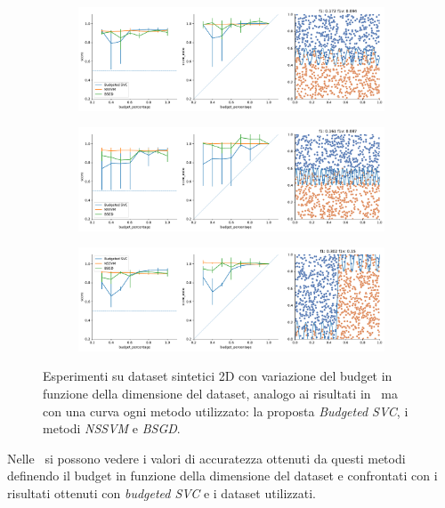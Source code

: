 \begin{figure}
\begin{subfigure}{.5\textwidth}
    \end{subfigure}%
    \hfill
    \begin{subfigure}{.5\textwidth}
        \centering
        \includegraphics[width=\textwidth]{img/comp_old/13.pdf}
    \end{subfigure}
    \begin{subfigure}{.5\textwidth}
        \centering
        \includegraphics[width=\textwidth]{img/comp_old/14.pdf}
    \end{subfigure}%
    \hfill
    \begin{subfigure}{.5\textwidth}
        \centering
        \includegraphics[width=\textwidth]{img/comp_old/15.pdf}
    \end{subfigure}
\caption{Esperimenti su dataset sintetici 2D con variazione del budget in funzione della dimensione del dataset, analogo ai risultati in~ ma con una curva ogni metodo utilizzato: la proposta \emph{Budgeted SVC}, i metodi \emph{NSSVM} e \emph{BSGD}.}
\label{fig:comp_old_2}
\end{figure}   
Nelle~ si possono vedere i valori di accuratezza ottenuti da questi metodi definendo il budget in funzione della dimensione del dataset e confrontati con i risultati ottenuti con \emph{budgeted SVC} e i dataset utilizzati.
